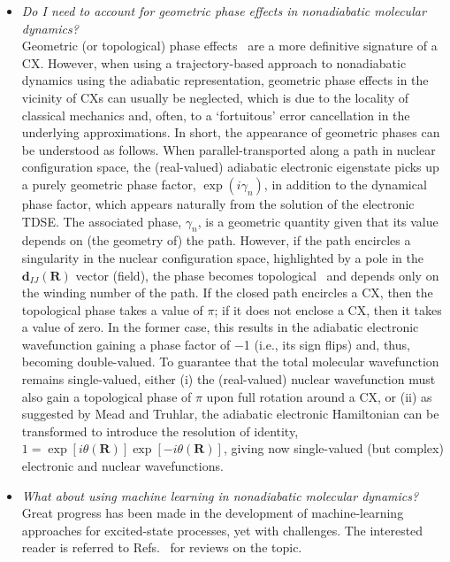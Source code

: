 \documentclass[9pt,bestpractices]{livecoms}
\newcommand{\R}{\mathbf{R}}
\newcommand{\nacv}[2]{\mathbf{d}_{#1#2}(\R)}
\begin{document}
\begin{itemize}
\item{\textit{Do I need to account for geometric phase effects in nonadiabatic molecular dynamics?} \\
Geometric (or topological) phase effects~\cite{mead_determination_1979, berry_quantal_1984} are a more definitive signature of a CX. However, when using a trajectory-based approach to nonadiabatic dynamics using the adiabatic representation, geometric phase effects in the vicinity of CXs can usually be neglected, which is due to the locality of classical mechanics and, often, to a `fortuitous' error cancellation in the underlying approximations.\cite{ryabinkin2017geometric,ibele2021diabolical,ryabinkin2014we} In short, the appearance of geometric phases can be understood as follows. When parallel-transported along a path in nuclear configuration space, the (real-valued) adiabatic electronic eigenstate picks up a purely geometric phase factor, $\exp{(i\gamma_n)}$, in addition to the dynamical phase factor, which appears naturally from the solution of the electronic TDSE.\cite{tannor2007approximate} The associated phase, $\gamma_n$, is a geometric quantity given that its value depends on (the geometry of) the path.\cite{daggett2024toward, ibele2023nature} However, if the path encircles a singularity in the nuclear configuration space, highlighted by a pole in the $\nacv{I}{J}$ vector (field), the phase becomes topological~\cite{daggett2024toward} and depends only on the winding number of the path.\cite{ibele2023nature} If the closed path encircles a CX, then the topological phase takes a value of $\pi$; if it does not enclose a CX, then it takes a value of zero.\cite{mead_geometric_1992} In the former case, this results in the adiabatic electronic wavefunction gaining a phase factor of $-$1 (i.e., its sign flips) and, thus, becoming double-valued.\cite{longuet-higgins_studies_1958, herzberg_intersection_1963}  To guarantee that the total molecular wavefunction remains single-valued, either (i) the (real-valued) nuclear wavefunction must also gain a topological phase of $\pi$ upon full rotation around a CX,\cite{tannor2007molecular} or (ii) as suggested by Mead and Truhlar,\cite{mead_determination_1979} the adiabatic electronic Hamiltonian can be transformed to introduce the resolution of identity, $1 = \exp{[i\theta(\R)]} \exp{[-i\theta(\R)]}$, giving now single-valued (but complex) electronic and nuclear wavefunctions.\cite{tannor2007molecular, ryabinkin2017geometric} 
}

\item{\textit{What about using machine learning in nonadiabatic molecular dynamics?} \\
Great progress has been made in the development of machine-learning approaches for excited-state processes, yet with challenges. The interested reader is referred to Refs.~ for reviews on the topic. 
}


\end{itemize}
\end{document}
